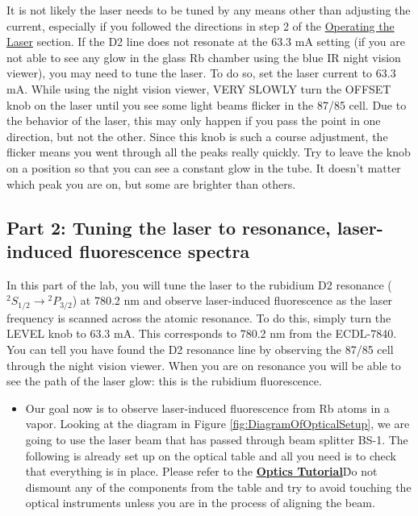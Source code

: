 \documentclass{../lab}
\begin{document}
It is not likely the laser needs to be tuned by any means other than adjusting the current, especially if you followed the directions in step 2 of the \hyperref[subsubsec:OperatingTheLaser]{Operating the Laser} section. If the D2 line does not resonate at the 63.3 mA setting (if you are not able to see any glow in the glass Rb chamber using the blue IR night vision viewer), you may need to tune the laser. To do so, set the laser current to 63.3 mA. While using the night vision viewer, VERY SLOWLY turn the OFFSET knob on the laser until you see some light beams flicker in the 87/85 cell. Due to the behavior of the laser, this may only happen if you pass the point in one direction, but not the other. Since this knob is such a course adjustment, the flicker means you went through all the peaks really quickly. Try to leave the knob on a position so that you can see a constant glow in the tube. It doesn't matter which peak you are on, but some are brighter than others.

\subsection{Part 2: Tuning the laser to resonance, laser-induced fluorescence spectra}

In this part of the lab, you will tune the laser to the rubidium D2 resonance ($^2S_{1/2} \rightarrow {}^2P_{3/2}$)  at 780.2 nm and observe laser-induced fluorescence as the laser frequency is scanned across the atomic resonance. To do this, simply turn the LEVEL knob to 63.3 mA. This corresponds to 780.2 nm from the ECDL-7840. You can tell you have found the D2 resonance line by observing the 87/85 cell through the night vision viewer. When you are on resonance you will be able to see the path of the laser glow: this is the rubidium fluorescence.

\begin{itemize}
    \item Our goal now is to observe laser-induced fluorescence from Rb atoms in a vapor. Looking at the diagram in Figure \ref{fig:DiagramOfOpticalSetup}, we are going to use the laser beam that has passed through beam splitter BS-1. The following is already set up on the optical table and all you need is to check that everything is in place. Please refer to the \href{https://berkeley-physics111b.github.io/appendices/OpticsTutorial/}{\textbf{Optics Tutorial}}\. Do not dismount any of the components from the table and try to avoid touching the optical instruments unless you are in the process of aligning the beam.

\end{itemize}
\end{document}
